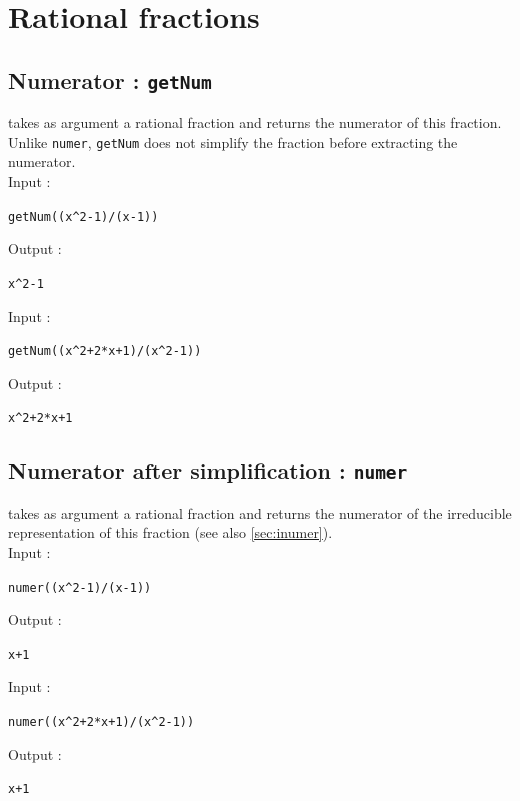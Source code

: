 \documentclass[a4paper,11pt]{book}
\begin{document}
\section{Rational fractions}
\subsection{Numerator : {\tt getNum}}\label{sec:getnum}
 takes as argument a rational fraction 
and returns the numerator of this fraction. Unlike {\tt numer},
{\tt getNum} does not simplify the fraction before extracting
the numerator.\\
Input :
\begin{center}{\tt getNum((x\verb|^|2-1)/(x-1)) }\end{center}
Output :
\begin{center}{\tt x\verb|^|2-1}\end{center}
Input :
\begin{center}{\tt getNum((x\verb|^|2+2*x+1)/(x\verb|^|2-1)) }\end{center}
Output :
\begin{center}{\tt x\verb|^|2+2*x+1}\end{center}

\subsection{Numerator after simplification : {\tt numer}}\label{sec:numer}
 takes as argument a rational fraction
and  returns the numerator of the irreducible representation of
this fraction (see also \ref{sec:inumer}).\\
Input :
\begin{center}{\tt numer((x\verb|^|2-1)/(x-1)) }\end{center}
Output :
\begin{center}{\tt x+1}\end{center}
Input :
\begin{center}{\tt numer((x\verb|^|2+2*x+1)/(x\verb|^|2-1)) }\end{center}
Output :
\begin{center}{\tt x+1}\end{center}
\end{document}

